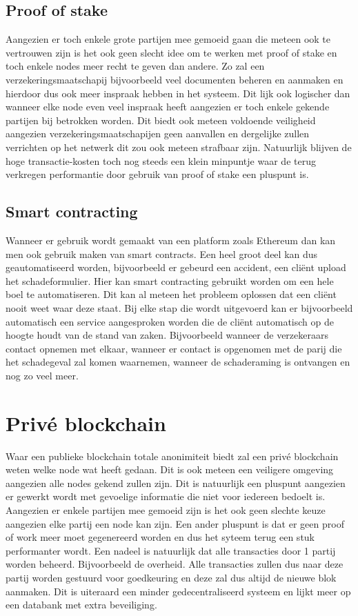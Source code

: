 \subsection{Proof of stake}
Aangezien er toch enkele grote partijen mee gemoeid gaan die meteen ook te vertrouwen zijn is het ook geen slecht idee om te werken met proof of stake en toch enkele nodes meer recht te geven dan andere. Zo zal een verzekeringsmaatschapij bijvoorbeeld veel documenten beheren en aanmaken en hierdoor dus ook meer inspraak hebben in het systeem. Dit lijk ook logischer dan wanneer elke node even veel inspraak heeft aangezien er toch enkele gekende partijen bij betrokken worden. Dit biedt ook meteen voldoende veiligheid aangezien verzekeringsmaatschapijen geen aanvallen en dergelijke zullen verrichten op het netwerk dit zou ook meteen strafbaar zijn. Natuurlijk blijven de hoge transactie-kosten toch nog steeds een klein minpuntje waar de terug verkregen performantie door gebruik van proof of stake een pluspunt is. 

\subsection{Smart contracting}
Wanneer er gebruik wordt gemaakt van een platform zoals Ethereum dan kan men ook gebruik maken van smart contracts. Een heel groot deel kan dus geautomatiseerd worden, bijvoorbeeld er gebeurd een accident, een cliënt upload het schadeformulier. Hier kan smart contracting gebruikt worden om een hele boel te automatiseren. Dit kan al meteen het probleem oplossen dat een cliënt nooit weet waar deze staat. Bij elke stap die wordt uitgevoerd kan er bijvoorbeeld automatisch een service aangesproken worden die de cliënt automatisch op de hoogte houdt van de stand van zaken. Bijvoorbeeld wanneer de verzekeraars contact opnemen met elkaar, wanneer er contact is opgenomen met de parij die het schadegeval zal komen waarnemen, wanneer de schaderaming is ontvangen en nog zo veel meer. 

\section{Privé blockchain}
Waar een publieke blockchain totale anonimiteit biedt zal een privé blockchain weten welke node wat heeft gedaan. Dit is ook meteen een veiligere omgeving aangezien alle nodes gekend zullen zijn. Dit is natuurlijk een pluspunt aangezien er gewerkt wordt met gevoelige informatie die niet voor iedereen bedoelt is. Aangezien er enkele partijen mee gemoeid zijn is het ook geen slechte keuze aangezien elke partij een node kan zijn. Een ander pluspunt is dat er geen proof of work meer moet gegenereerd worden en dus het syteem terug een stuk performanter wordt. Een nadeel is natuurlijk dat alle transacties door 1 partij worden beheerd. Bijvoorbeeld de overheid. Alle transacties zullen dus naar deze partij worden gestuurd voor goedkeuring en deze zal dus altijd de nieuwe blok aanmaken. Dit is uiteraard een minder gedecentraliseerd systeem en lijkt meer op een databank met extra beveiliging. 

